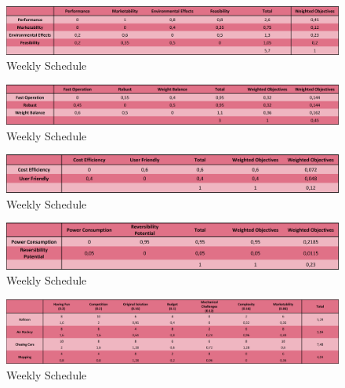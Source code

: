 \documentclass[a4paper,12pt]{article}
\begin{document}
\begin{figure}[H]
	\centering
	\includegraphics[width=\textwidth,height=\textheight,keepaspectratio]{images/proje_objective_tree} 
	\caption{\label{fig:schedule}Weekly Schedule}
	
\end{figure}


\begin{figure}[H]
	\centering
	\includegraphics[width=\textwidth,height=\textheight,keepaspectratio]{images/proje_objective_tree_2} 
	\caption{\label{fig:schedule}Weekly Schedule}
	
\end{figure}


\begin{figure}[H]
	\centering
	\includegraphics[width=\textwidth,height=\textheight,keepaspectratio]{images/proje_objective_tree_3} 
	\caption{\label{fig:schedule}Weekly Schedule}
	
\end{figure}


\begin{figure}[H]
	\centering
	\includegraphics[width=\textwidth,height=\textheight,keepaspectratio]{images/proje_objective_tree_4} 
	\caption{\label{fig:schedule}Weekly Schedule}
	
\end{figure}

\begin{figure}[H]
	\centering
	\includegraphics[width=\textwidth,height=\textheight,keepaspectratio]{images/project_evaluation} 
	\caption{\label{fig:schedule}Weekly Schedule}
	
\end{figure}
\end{document}
